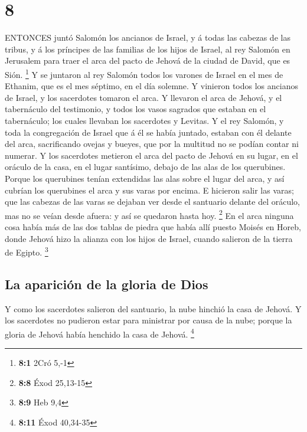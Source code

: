 \hypertarget{section-7}{%
\section{8}\label{section-7}}

 ENTONCES juntó Salomón los ancianos de Israel, y á todas
las cabezas de las tribus, y á los príncipes de las familias de los
hijos de Israel, al rey Salomón en Jerusalem para traer el arca del
pacto de Jehová de la ciudad de David, que es Sión. \footnote{\textbf{8:1}
  2Cró 5,-1}  Y se juntaron al rey Salomón todos los varones
de Israel en el mes de Ethanim, que es el mes séptimo, en el día
solemne.  Y vinieron todos los ancianos de Israel, y los
sacerdotes tomaron el arca.  Y llevaron el arca de Jehová, y
el tabernáculo del testimonio, y todos los vasos sagrados que estaban en
el tabernáculo; los cuales llevaban los sacerdotes y Levitas.
 Y el rey Salomón, y toda la congregación de Israel que á él
se había juntado, estaban con él delante del arca, sacrificando ovejas y
bueyes, que por la multitud no se podían contar ni numerar. 
Y los sacerdotes metieron el arca del pacto de Jehová en su lugar, en el
oráculo de la casa, en el lugar santísimo, debajo de las alas de los
querubines.  Porque los querubines tenían extendidas las
alas sobre el lugar del arca, y así cubrían los querubines el arca y sus
varas por encima.  E hicieron salir las varas; que las
cabezas de las varas se dejaban ver desde el santuario delante del
oráculo, mas no se veían desde afuera: y así se quedaron hasta hoy.
\footnote{\textbf{8:8} Éxod 25,13-15}  En el arca ninguna
cosa había más de las dos tablas de piedra que había allí puesto Moisés
en Horeb, donde Jehová hizo la alianza con los hijos de Israel, cuando
salieron de la tierra de Egipto. \footnote{\textbf{8:9} Heb 9,4}

\hypertarget{la-apariciuxf3n-de-la-gloria-de-dios}{%
\subsection{La aparición de la gloria de
Dios}\label{la-apariciuxf3n-de-la-gloria-de-dios}}

 Y como los sacerdotes salieron del santuario, la nube
hinchió la casa de Jehová.  Y los sacerdotes no pudieron
estar para ministrar por causa de la nube; porque la gloria de Jehová
había henchido la casa de Jehová. \footnote{\textbf{8:11} Éxod 40,34-35}

